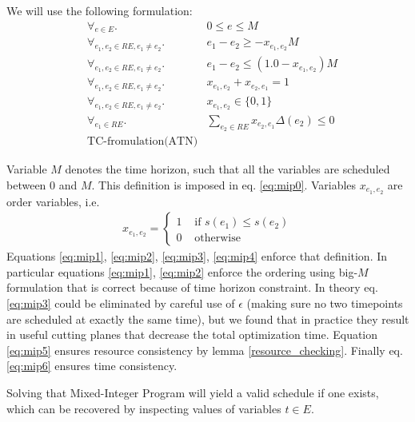 We will use the following formulation:
\begin{align}
\label{eq:mip0} & \forall_{e \in E}.              & 0 \leq e \leq M \\
\label{eq:mip1} & \forall_{e_1, e_2 \in RE, e_1 \neq e_2}. & e_1 - e_2 \geq - x_{e_1,e_2} M \\
\label{eq:mip2} & \forall_{e_1, e_2 \in RE, e_1 \neq e_2}. & e_1 - e_2 \leq (1.0 - x_{e_1,e_2}) M\\
\label{eq:mip3} & \forall_{e_1, e_2 \in RE, e_1 \neq e_2}. & x_{e_1,e_2} + x_{e_2,e_1}  = 1\\
\label{eq:mip4} & \forall_{e_1, e_2 \in RE, e_1 \neq e_2}. & x_{e_1,e_2} \in \{ 0, 1 \} \\
\label{eq:mip5} & \forall_{e_1 \in RE}.                    & \sum_{e_2 \in RE} x_{e_2, e_1} \Delta(e_2) \leq 0\\
\label{eq:mip6} & \text{TC-fromulation(ATN)}
\end{align}

Variable $M$ denotes the time horizon, such that all the variables are scheduled between $0$ and $M$. This definition is imposed in eq. \ref{eq:mip0}.
Variables $x_{e_1,e_2}$ are order variables, i.e.
\begin{align*}
x_{e_1, e_2} = \begin{cases}
1 &\text{ if }s(e_1) \leq s(e_2) \\
0 &\text{ otherwise}
\end{cases}
\end{align*}
Equations \ref{eq:mip1}, \ref{eq:mip2}, \ref{eq:mip3}, \ref{eq:mip4} enforce that definition. In particular equations \ref{eq:mip1}, \ref{eq:mip2} enforce the ordering using big-$M$ formulation that is correct because of time horizon constraint. In theory eq. \ref{eq:mip3} could be eliminated by careful use of $\epsilon$ (making sure no two timepoints are scheduled at exactly the same time), but we found that in practice they result in useful cutting planes that decrease the total optimization time. Equation \ref{eq:mip5} ensures resource consistency by lemma \ref{resource_checking}. Finally eq. \ref{eq:mip6} ensures time consistency.

Solving that Mixed-Integer Program will yield a valid schedule if one exists, which can be recovered by inspecting values of variables $t \in E$.

